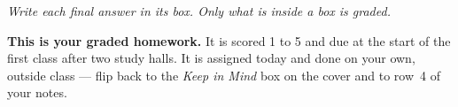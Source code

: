 \documentclass[12pt]{article}
\begin{document}
{\small\itshape Write each final answer in its box. Only what is inside a box is graded.}\par

\vspace{0.08in}

\begin{remindbox}
\small
\textbf{This is your graded homework.} It is scored 1 to 5 and due at the start of the first
class after two study halls. It is assigned today and done on your own, outside class --- flip
back to the \emph{Keep in Mind} box on the cover and to row~4 of your notes.
\end{remindbox}

\vspace{0.06in}
\end{document}
